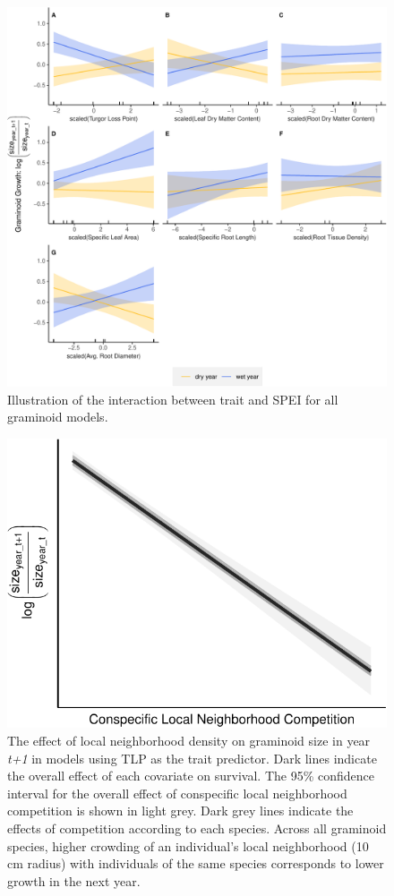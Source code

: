 \documentclass[12pt, letterpaper]{article}
\begin{document}
\begin{figure}
\includegraphics[width=1\textwidth]{figures/supGramGrowthPlots-1.pdf}
\caption{\small{
Illustration of the interaction between trait and SPEI for all graminoid models.
}}
\label{fig:Growth_all}
\end{figure}

\begin{figure}
    \centering
    \includegraphics[width=.5\textwidth]{figures/growthEffectPlots-1.pdf}
    \caption{The effect of local neighborhood density on graminoid size in year \textit{t+1} in models using TLP as the trait predictor. Dark lines indicate the overall effect of each covariate on survival. The 95\% confidence interval for the overall effect of conspecific local neighborhood competition is shown in light grey. Dark grey lines indicate the effects of competition according to each species. Across all graminoid species, higher crowding of an individual's local neighborhood (10 cm radius) with individuals of the same species corresponds to lower growth in the next year.}
    \label{fig:Effects_Growth}
\end{figure}
\end{document}
